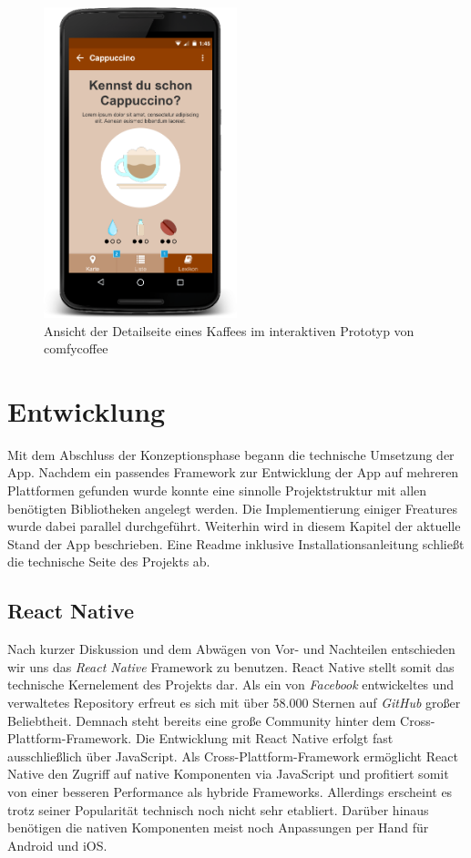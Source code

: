 \begin{figure}[H]
    \centering
		\includegraphics[width=0.5\textwidth]{Bilder/detail.png}
		\caption{Ansicht der Detailseite eines Kaffees im interaktiven Prototyp von comfycoffee}
\end{figure}


\chapter{Entwicklung}
\label{entwicklung}
Mit dem Abschluss der Konzeptionsphase begann die technische Umsetzung der App.
Nachdem ein passendes Framework zur Entwicklung der App auf mehreren Plattformen gefunden wurde konnte eine sinnolle Projektstruktur mit allen benötigten Bibliotheken angelegt werden.
Die Implementierung einiger Freatures wurde dabei parallel durchgeführt.
Weiterhin wird in diesem Kapitel der aktuelle Stand der App beschrieben.
Eine Readme inklusive Installationsanleitung schließt die technische Seite des Projekts ab.



\section{React Native}
\label{sec:reactnative}
Nach kurzer Diskussion und dem Abwägen von Vor- und Nachteilen entschieden wir uns das \emph{React Native} Framework zu benutzen.
React Native stellt somit das technische Kernelement des Projekts dar.
Als ein von \emph{Facebook} entwickeltes und verwaltetes Repository erfreut es sich mit über 58.000 Sternen auf \emph{GitHub} großer Beliebtheit.
Demnach steht bereits eine große Community hinter dem Cross-Plattform-Framework.
Die Entwicklung mit React Native erfolgt fast ausschließlich über JavaScript.
Als Cross-Plattform-Framework ermöglicht React Native den Zugriff auf native Komponenten via JavaScript und profitiert somit von einer besseren Performance als hybride Frameworks.
Allerdings erscheint es trotz seiner Popularität technisch noch nicht sehr etabliert.
Darüber hinaus benötigen die nativen Komponenten meist noch Anpassungen per Hand für Android und iOS.



